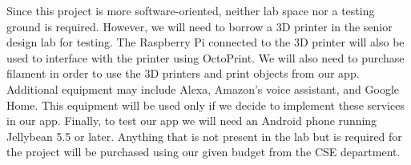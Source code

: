 Since this project is more software-oriented, neither lab space nor a testing ground is required. However, we will need to borrow a 3D printer in the senior design lab for testing. The Raspberry Pi connected to the 3D printer will also be used to interface with the printer using OctoPrint. We will also need to purchase filament in order to use the 3D printers and print objects from our app. Additional equipment may include Alexa, Amazon's voice assistant, and Google Home. This equipment will be used only if we decide to implement these services in our app. Finally, to test our app we will need an Android phone running Jellybean 5.5 or later. Anything that is not present in the lab but is required for the project will be purchased using our given budget from the CSE department. 



